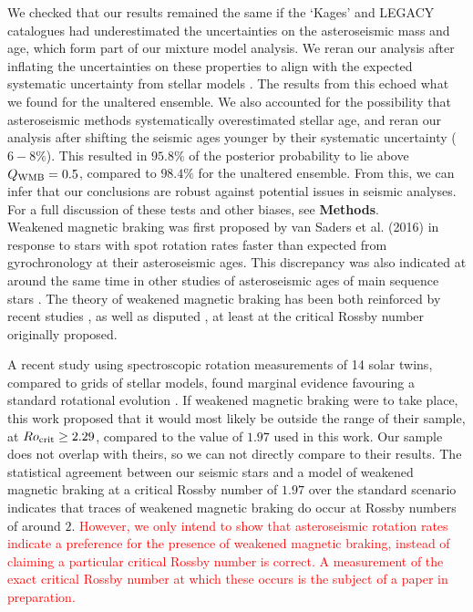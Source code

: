 \documentclass[12pt]{article}
\newcommand{\rtwo}[1]{\textcolor{red}{{#1}}}
\begin{document}
We checked that our results remained the same if the `Kages' and LEGACY catalogues had underestimated the uncertainties on the asteroseismic mass and age, which form part of our mixture model analysis. We reran our analysis after inflating the uncertainties on these properties to align with the expected systematic uncertainty from stellar models \cite{silvaaguirre+2015,silvaaguirre+2017}. The results from this echoed what we found for the unaltered ensemble. We also accounted for the possibility that asteroseismic methods systematically overestimated stellar age, and reran our analysis after shifting the seismic ages younger by their systematic uncertainty ($6-8\%$). This resulted in $95.8\%$ of the posterior probability to lie above $Q_{\rm WMB} = 0.5$, compared to $98.4\%$ for the unaltered ensemble. From this, we can infer that our conclusions are robust against potential issues in seismic analyses. For a full discussion of these tests and other biases, see \textbf{Methods}.\\

Weakened magnetic braking was first proposed by van Saders et al. (2016) \cite[hereafter the `van Saders' study]{vansaders+2016} in response to stars with spot rotation rates faster than expected from gyrochronology at their asteroseismic ages. This discrepancy was also indicated at around the same time in other studies of asteroseismic ages of main sequence stars \cite{angus+2015, nielsen+2015,  davies+2015}. The theory of weakened magnetic braking has been both reinforced by recent studies \cite{metcalfe+egeland2019}, as well as disputed \cite{lorenzo-oliveira+2019}, at least at the critical Rossby number originally proposed.

A recent study using spectroscopic rotation measurements of 14 solar twins, compared to grids of stellar models, found marginal evidence favouring a standard rotational evolution \cite{lorenzo-oliveira+2019}. If weakened magnetic braking were to take place, this work proposed that it would most likely be outside the range of their sample, at $Ro_{\rm {crit}} \geq 2.29$, compared to the value of $1.97$ used in this work. Our sample does not overlap with theirs, so we can not directly compare to their results.
The statistical agreement between our seismic stars and a model of weakened magnetic braking at a critical Rossby number of $1.97$ over the standard scenario indicates that traces of weakened magnetic braking do occur at Rossby numbers of around $2$. \rtwo{However, we only intend to show that asteroseismic rotation rates indicate a preference for the presence of weakened magnetic braking, instead of claiming a particular critical Rossby number is correct. A measurement of the exact critical Rossby number at which these occurs is the subject of a paper in preparation.}
\end{document}
